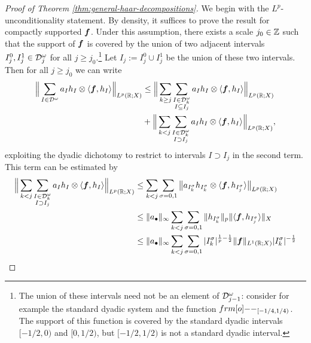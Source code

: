 \begin{proof}[Proof of Theorem \ref{thm:general-haar-decompositions}]
  We begin with the $L^p$-unconditionality statement.
  By density, it suffices to prove the result for compactly supported $\bm{f}$.
  Under this assumption, there exists a scale $j_{0} \in \mathbb{Z}$ such that the support of $\bm{f}$ is covered by the union of two adjacent intervals $I_{j}^{0}, I_{j}^{1} \in \mathcal{D}^{\omega}_{j}$ for all $j \geq j_{0}$.\footnote{The union of these intervals need not be an element of $\mathcal{D}^{\omega}_{j-1}$: consider for example the standard dyadic system and the function $\1_{[-1/4,1/4)}$.
    The support of this function is covered by the standard dyadic intervals $[-1/2,0)$ and $[0,1/2)$, but $[-1/2,1/2)$ is not a standard dyadic interval.}
  Let $I_{j} := I_{j}^{0} \cup I_{j}^{1}$ be the union of these two intervals.
  Then for all $j \geq j_{0}$ we can write
  \begin{equation*}
    \begin{aligned}
      \Big\| \sum_{I \in \mathcal{D}^{\omega}} a_{I} h_{I} \otimes \langle \bm{f}, h_{I} \rangle \Big\|_{L^p(\mathbb{R};X)}
      &\leq \Big\| \sum_{k \geq j} \sum_{\substack{I \in \mathcal{D}_{k}^{\omega} \\ I \subseteq I_{j}}} a_{I} h_{I} \otimes \langle \bm{f}, h_{I} \rangle \Big\|_{L^p(\mathbb{R};X)} \\
      &+ \Big\| \sum_{k < j} \sum_{\substack{I \in \mathcal{D}_{k}^{\omega} \\ I \supset I_{j}}} a_{I} h_{I} \otimes \langle \bm{f}, h_{I} \rangle \Big\|_{L^p(\mathbb{R};X)},
    \end{aligned}
  \end{equation*}
  exploiting the dyadic dichotomy to restrict to intervals $I \supset I_{j}$ in the second term.
  This term can be estimated by
  \begin{equation*}
    \begin{aligned}
      \Big\| \sum_{k < j} \sum_{\substack{I \in \mc{D}_{k}^{\omega} \\ I \supset I_{j}}} a_{I} h_{I} \otimes \langle \mb{f}, h_{I} \rangle \Big\|_{L^p(\R;X)}
      &\leq \sum_{k < j} \sum_{\sigma = 0,1} \big\| a_{I^{\sigma}_{k}} h_{I^{\sigma}_{k}} \otimes \langle \mb{f}, h_{I^{\sigma}_{j}} \rangle \big\|_{L^p(\R;X)} \\
      &\leq \|a_{\bullet}\|_{\infty} \sum_{k < j} \sum_{\sigma = 0,1} \|h_{I^{\sigma}_{k}}\|_{p} \| \langle \mb{f}, h_{I^{\sigma}_{j}} \rangle \|_{X} \\
      &\leq \|a_{\bullet}\|_{\infty} \sum_{k < j} \sum_{\sigma = 0,1} |I_{k}^\sigma|^{\frac{1}{p}-\frac{1}{2}} \|\mb{f}\|_{L^1(\R;X)} |I_{k}^{\sigma}|^{-\frac{1}{2}} \\

\end{aligned}
\end{equation*}
\end{proof}
